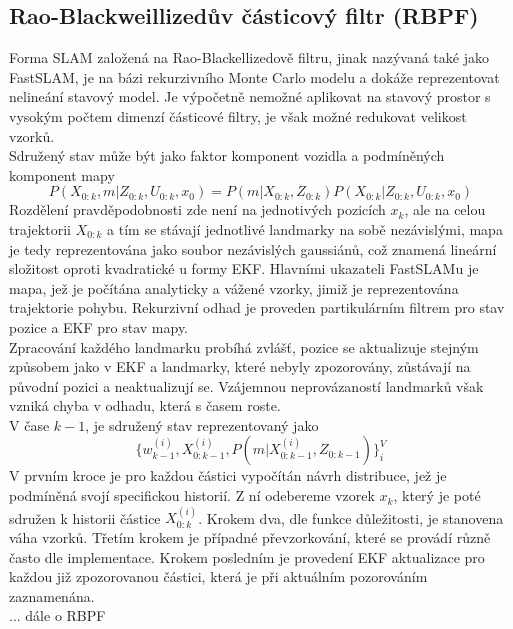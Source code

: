 \documentclass[11pt]{article}
\begin{document}
\subsection{Rao-Blackweillizedův částicový filtr (RBPF)}
Forma SLAM založená na Rao-Blackellizedově filtru, jinak nazývaná také jako FastSLAM, je na bázi rekurzivního Monte Carlo modelu a dokáže reprezentovat nelineání stavový model. Je výpočetně nemožné aplikovat na stavový prostor s vysokým počtem dimenzí částicové filtry, je však možné redukovat velikost vzorků. \\
Sdružený stav může být jako faktor komponent vozidla a podmíněných komponent mapy
\begin{equation}
	P(X_{0:k},m|Z_{0:k},U_{0:k},x_0)=P(m|X_{0:k},Z_{0:k})P(X_{0:k}|Z_{0:k},U_{0:k},x_0)
\end{equation}
Rozdělení pravděpodobnosti zde není na jednotivých pozicích $x_k$, ale na celou trajektorii $X_{0:k}$ a tím se stávají jednotlivé landmarky na sobě nezávislými, mapa je tedy reprezentována jako soubor nezávislých gaussiánů, což znamená lineární složitost oproti kvadratické u formy EKF. Hlavními ukazateli FastSLAMu je mapa, jež je počítána analyticky a vážené vzorky, jimiž je reprezentována trajektorie pohybu. Rekurzivní odhad je proveden partikulárním filtrem pro stav pozice a EKF pro stav mapy.\\
\indent Zpracování každého landmarku probíhá zvlášť, pozice se aktualizuje stejným způsobem jako v EKF a landmarky, které nebyly zpozorovány, zůstávají na původní pozici a neaktualizují se. Vzájemnou neprovázaností landmarků však vzniká chyba v odhadu, která s časem roste.\\
\indent V čase $k-1$, je sdružený stav reprezentovaný jako 
\begin{equation}
	\{w^{(i)}_{k-1},X^{(i)}_{0:k-1},P(m|X^{(i)}_{0:k-1},Z_{0:k-1})\}^V_i
\end{equation}
V prvním kroce je pro každou částici vypočítán návrh distribuce, jež je podmíněná svojí specifickou historií. Z ní odebereme vzorek $x_k$, který je poté sdružen k historii částice $X^{(i)}_{0:k}$. Krokem dva, dle funkce důležitosti, je stanovena váha vzorků. Třetím krokem je případné převzorkování, které se provádí různě často dle implementace. Krokem posledním je provedení EKF aktualizace pro každou již zpozorovanou částici, která je při aktuálním pozorováním zaznamenána. \\
... dále o RBPF
\end{document}
